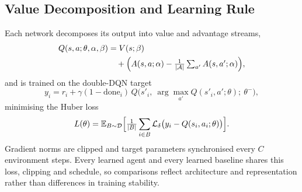 \documentclass[10pt,journal,comsoc]{IEEEtran}
\begin{document}
\subsection{Value Decomposition and Learning Rule}
Each network decomposes its output into value and advantage streams,
\begin{align}
Q(s,a;\theta,\alpha,\beta) &= V(s;\beta) \notag\\
&\quad + \Bigl( A(s,a;\alpha) - \tfrac{1}{|\mathcal{A}|}\textstyle\sum_{a'} A(s,a';\alpha) \Bigr),
\label{eq:duel}
\end{align}
and is trained on the double-DQN target
\begin{equation}
y_i = r_i + \gamma(1-\text{done}_i)\,
Q\bigl(s'_i,\ \arg\max_{a'} Q(s'_i,a';\theta);\ \theta^{-}\bigr),
\label{eq:target}
\end{equation}
minimising the Huber loss
\begin{equation}
L(\theta) = \mathbb{E}_{B\sim\mathcal{D}}
\Bigl[ \tfrac{1}{|B|}\sum_{i\in B} \mathcal{L}_{\delta}\bigl(y_i - Q(s_i,a_i;\theta)\bigr) \Bigr].
\label{eq:loss}
\end{equation}
Gradient norms are clipped and target parameters synchronised every $C$
environment steps. Every learned agent and every learned baseline shares
this loss, clipping and schedule, so comparisons reflect architecture and
representation rather than differences in training stability.
\end{document}

